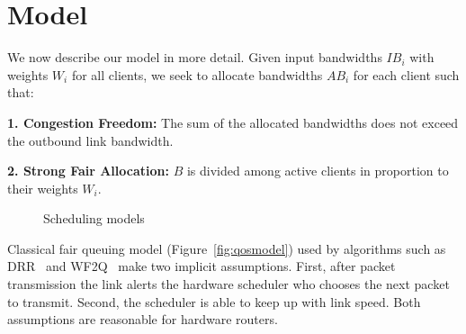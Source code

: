 \section{Model}
\label{sec:model}
We now describe our model in more detail.  Given input bandwidths $IB_i$ with
weights $W_i$ for all clients, we seek to allocate bandwidths $AB_i$ for each
client such that:  

{\bf 1. Congestion Freedom:}  The sum of the allocated bandwidths does not
exceed the outbound link bandwidth.

{\bf 2. Strong Fair Allocation: } $B$ is divided among active clients in proportion
to their weights $W_i$.

\begin{figure}[t]
\center
{}
\caption{Scheduling models}
\label{fig:sched_mod}
\end{figure}

Classical fair queuing model (Figure~\ref{fig:qosmodel}) used by algorithms such
as DRR~\cite{drr} and WF2Q~\cite{wf2q} make two implicit assumptions. First,
after packet transmission the link alerts the hardware scheduler who chooses the
next packet to transmit. Second, the scheduler is able to keep up with link
speed.  Both assumptions are reasonable for hardware routers.

